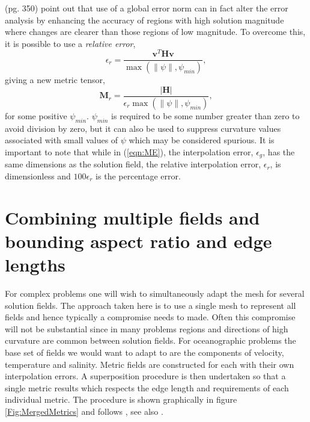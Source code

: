 \citep{george1998} (pg. 350) point out that use of a global error norm
can in fact alter the error analysis by enhancing the accuracy of
regions with high solution magnitude where changes are clearer than
those regions of low magnitude. To overcome this, it is possible to
use a {\it relative error},
\begin{equation*}\label{eqn:relative_error_3D}
  \epsilon_r=\frac{\pmb{v}^T \pmb{H} \pmb{v}}{\max(\|\psi\|, \psi_{min})},
\end{equation*}
giving a new metric tensor,
\begin{equation*}\label{eqn:relative_metric}
  \pmb{M}_r = \frac{\vert\pmb{H}\vert}{\epsilon_r\max(\|\psi\|, \psi_{min})},
\end{equation*}
for some positive $\psi_{min}$. $\psi_{min}$ is required to be some
number greater than zero to avoid division by zero, but it can also be
used to suppress curvature values associated with small values of
$\psi$ which may be considered spurious. It is important to note that
while in (\ref{eqn:ME}), the interpolation error, $\epsilon_g$, has
the same dimensions as the solution field, the relative interpolation
error, $\epsilon_r$, is dimensionless and $100\epsilon_r$ is the
percentage error.


\section{Combining multiple fields and bounding aspect ratio and edge lengths}

For complex problems one will wish to simultaneously adapt the mesh
for several solution fields. The approach taken here is to use a
single mesh to represent all fields and hence typically a compromise
needs to made. Often this compromise will not be substantial since in
many problems regions and directions of high curvature are common
between solution fields. For oceanographic problems the base set of
fields we would want to adapt to are the components of velocity,
temperature and salinity. Metric fields are constructed for each with
their own interpolation errors. A superposition procedure is then
undertaken so that a single metric results which respects the edge
length and requirements of each individual metric. The procedure is
shown graphically in figure \ref{Fig:MergedMetrics} and follows
\citep{pain2001}, see also \citep{castrodiaz1997,george1998}.

